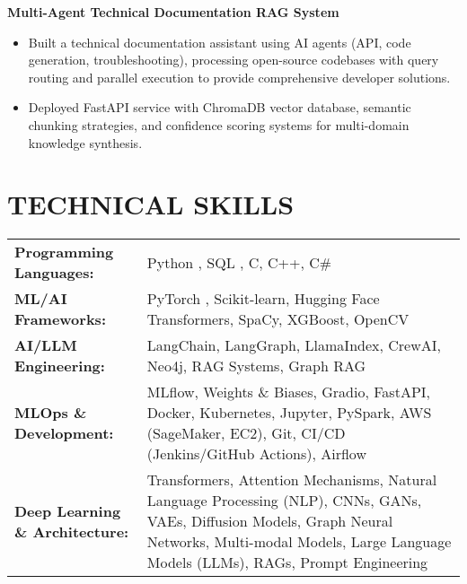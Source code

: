 \documentclass[10pt, letterpaper]{article}
\begin{document}
\textbf{Multi-Agent Technical Documentation RAG System} 
\vspace{-0.5em}
\begin{itemize}[leftmargin=*, itemsep=0pt, topsep=0pt, partopsep=0pt, parsep=0pt]
\item Built a technical documentation assistant using AI agents (API, code generation, troubleshooting), processing open-source codebases with query routing and parallel execution to provide comprehensive developer solutions.
\item Deployed FastAPI service with ChromaDB vector database, semantic chunking strategies, and confidence scoring systems for multi-domain knowledge synthesis.
\end{itemize}

\section{TECHNICAL SKILLS}
\begin{tabularx}{\textwidth}{@{}lX@{}}
    \textbf{Programming Languages:} & Python , SQL , C, C++, C\#\\
    \textbf{ML/AI Frameworks:} & PyTorch , Scikit-learn, Hugging Face Transformers, SpaCy, XGBoost, OpenCV\\
    \textbf{AI/LLM Engineering:} & LangChain, LangGraph, LlamaIndex, CrewAI, Neo4j, RAG Systems, Graph RAG\\
    \textbf{MLOps \& Development:} & MLflow, Weights \& Biases, Gradio, FastAPI, Docker, Kubernetes, Jupyter, PySpark, AWS (SageMaker, EC2), Git, CI/CD (Jenkins/GitHub Actions), Airflow\\
    \textbf{Deep Learning \& Architecture:} & Transformers, Attention Mechanisms, Natural Language Processing (NLP), CNNs, GANs, VAEs, Diffusion Models, Graph Neural Networks,  Multi-modal Models, Large Language Models (LLMs), RAGs, Prompt Engineering\\
\end{tabularx}
\end{document}
